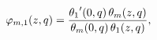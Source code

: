 \[\mathop{\varphi_{m,1}\/}\nolimits\!\left(z,q\right)=\frac{\mathop{\theta_{1}\/%
}\nolimits'\!\left(0,q\right)\mathop{\theta_{m}\/}\nolimits\!\left(z,q\right)}%
{\mathop{\theta_{m}\/}\nolimits\!\left(0,q\right)\mathop{\theta_{1}\/}%
\nolimits\!\left(z,q\right)},\]